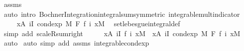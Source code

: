 \begin{isabellebody}
\ assms\ \isamarkupfalse%
\ {\isacharparenleft}{\kern0pt}auto\ intro{\isacharbang}{\kern0pt}{\isacharcolon}{\kern0pt}\ Bochner{\isacharunderscore}{\kern0pt}Integration{\isachardot}{\kern0pt}integral{\isacharunderscore}{\kern0pt}sum{\isacharbrackleft}{\kern0pt}symmetric{\isacharbrackright}{\kern0pt}\ integrable{\isacharunderscore}{\kern0pt}mult{\isacharunderscore}{\kern0pt}indicator{\isacharparenright}{\kern0pt}\isanewline
\ \ \isamarkupfalse%
\ \isamarkupfalse%
\ {\isachardoublequoteopen}{\isachardot}{\kern0pt}{\isachardot}{\kern0pt}{\isachardot}{\kern0pt}\ {\isacharequal}{\kern0pt}\ {\isacharparenleft}{\kern0pt}{\isasymintegral}x{\isasymin}A{\isachardot}{\kern0pt}\ {\isacharparenleft}{\kern0pt}{\isasymSum}i{\isasymin}I{\isachardot}{\kern0pt}\ cond{\isacharunderscore}{\kern0pt}exp\ M\ F\ {\isacharparenleft}{\kern0pt}f\ i{\isacharparenright}{\kern0pt}\ x{\isacharparenright}{\kern0pt}{\isasympartial}M{\isacharparenright}{\kern0pt}{\isachardoublequoteclose}\ \isamarkupfalse%
\ set{\isacharunderscore}{\kern0pt}lebesgue{\isacharunderscore}{\kern0pt}integral{\isacharunderscore}{\kern0pt}def\ \isamarkupfalse%
\ {\isacharparenleft}{\kern0pt}simp\ add{\isacharcolon}{\kern0pt}\ scaleR{\isacharunderscore}{\kern0pt}sum{\isacharunderscore}{\kern0pt}right{\isacharparenright}{\kern0pt}\isanewline
\ \ \isamarkupfalse%
\ \isamarkupfalse%
\ {\isachardoublequoteopen}{\isacharparenleft}{\kern0pt}{\isasymintegral}x{\isasymin}A{\isachardot}{\kern0pt}\ {\isacharparenleft}{\kern0pt}{\isasymSum}i{\isasymin}I{\isachardot}{\kern0pt}\ f\ i\ x{\isacharparenright}{\kern0pt}{\isasympartial}M{\isacharparenright}{\kern0pt}\ {\isacharequal}{\kern0pt}\ {\isacharparenleft}{\kern0pt}{\isasymintegral}x{\isasymin}A{\isachardot}{\kern0pt}\ {\isacharparenleft}{\kern0pt}{\isasymSum}i{\isasymin}I{\isachardot}{\kern0pt}\ cond{\isacharunderscore}{\kern0pt}exp\ M\ F\ {\isacharparenleft}{\kern0pt}f\ i{\isacharparenright}{\kern0pt}\ x{\isacharparenright}{\kern0pt}{\isasympartial}M{\isacharparenright}{\kern0pt}{\isachardoublequoteclose}\ \isamarkupfalse%
\ auto\isanewline
{}\isamarkupfalse%
\ {\isacharparenleft}{\kern0pt}auto\ simp\ add{\isacharcolon}{\kern0pt}\ assms\ integrable{\isacharunderscore}{\kern0pt}cond{\isacharunderscore}{\kern0pt}exp{\isacharparenright}{\kern0pt}%
\endisatagproof
{\isafoldproof}%
%
\isadelimproof
%
\endisadelimproof
%
\isadelimdocument
%
\endisadelimdocument
%
\isatagdocument
%
\end{isabellebody}
